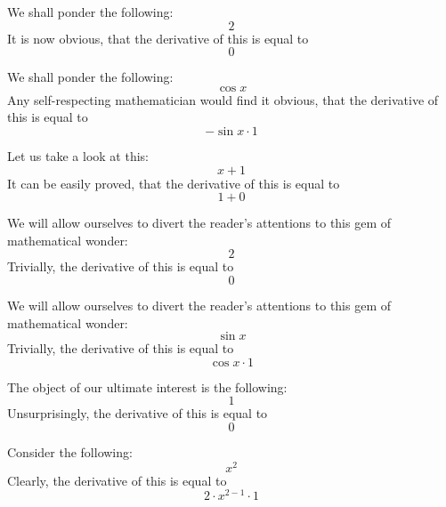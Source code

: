 \documentclass{article}
\begin{document}
We shall ponder the following:
\begin{equation}
2 
\end{equation}
It is now obvious, that the derivative of this is equal to
\begin{equation}
0 
\end{equation}

We shall ponder the following:
\begin{equation}
\cos x 
\end{equation}
Any self-respecting mathematician would find it obvious, that the derivative of this is equal to
\begin{equation}
-\sin x \cdot 1 
\end{equation}

Let us take a look at this:
\begin{equation}
x + 1 
\end{equation}
It can be easily proved, that the derivative of this is equal to
\begin{equation}
1 + 0 
\end{equation}

We will allow ourselves to divert the reader's attentions to this gem of mathematical wonder:
\begin{equation}
2 
\end{equation}
Trivially, the derivative of this is equal to
\begin{equation}
0 
\end{equation}

We will allow ourselves to divert the reader's attentions to this gem of mathematical wonder:
\begin{equation}
\sin x 
\end{equation}
Trivially, the derivative of this is equal to
\begin{equation}
\cos x \cdot 1 
\end{equation}

The object of our ultimate interest is the following:
\begin{equation}
1 
\end{equation}
Unsurprisingly, the derivative of this is equal to
\begin{equation}
0 
\end{equation}

Consider the following:
\begin{equation}
x ^{2 } 
\end{equation}
Clearly, the derivative of this is equal to
\begin{equation}
2 \cdot x ^{2 - 1 } \cdot 1 
\end{equation}
\end{document}
